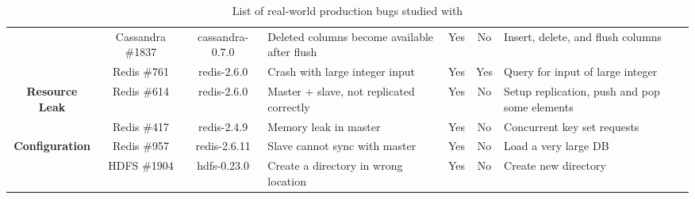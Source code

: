 \begin{table*}[ht]
{\begin{tabular}{@{}c c c p{5.15cm} c c p{4.5cm}@{}}
			& Cassandra \#1837 & cassandra-0.7.0 & Deleted columns become available after flush & Yes & No & Insert, delete, and flush columns \\ %
			& Redis \#761 & redis-2.6.0 & Crash with large integer input & Yes & Yes & Query for input of large integer \\ \midrule
			\multirow{2}{*}{\textbf{Resource Leak}} & Redis \#614 & redis-2.6.0 & Master + slave, not replicated correctly & Yes & No & Setup replication, push  and pop some elements \\ %
			& Redis \#417 & redis-2.4.9 & Memory leak in master & Yes & No & Concurrent key set requests \\ \midrule
			\multirow{2}{*}{\textbf{Configuration}} & Redis \#957 & redis-2.6.11 & Slave cannot sync with master & Yes & No & Load a very large DB \\ %
			& HDFS \#1904 & hdfs-0.23.0 & Create a directory in wrong location & Yes & No & Create new directory \\ \bottomrule
		\end{tabular}%
	}
	\caption{List of real-world production bugs studied with \parikshan}
	\label{tab:casestudy}
\end{table*}